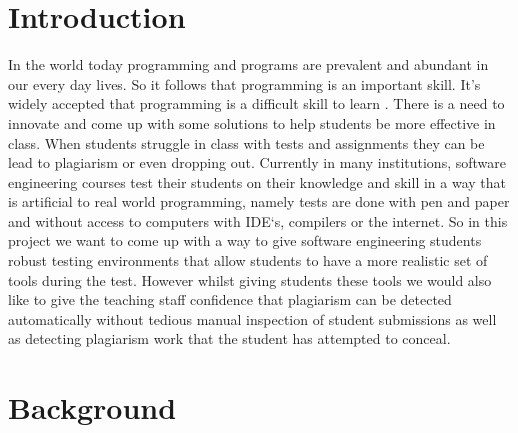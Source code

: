 \documentclass[twocolumn]{article}
\begin{document}


\begin{abstract}

\end{abstract}

\section{Introduction}
In the world today programming and programs are prevalent and abundant in our
every day lives. So it follows that programming is an important skill. It's
widely accepted that programming is a difficult skill to learn
\cite{jenkins2002difficulty, robins2003learning}. There is a need to innovate
and come up with some solutions to help students be more effective in class.
When students struggle in class with tests and assignments they can be lead to
plagiarism or even dropping out\cite{bennedsen2007failure}. Currently in many
institutions, software engineering courses test their students on their
knowledge and skill in a way that is artificial to real world programming,
namely tests are done with pen and paper and without access to computers with
IDE`s, compilers or the internet. So in this project we want to come up with a
way to give software engineering students robust testing environments that allow
students to have a more realistic set of tools during the test. However whilst
giving students these tools we would also like to give the teaching staff
confidence that plagiarism can be detected automatically without tedious manual
inspection of student submissions as well as detecting plagiarism work that the
student has attempted to conceal.

\section{Background}

\end{document}
